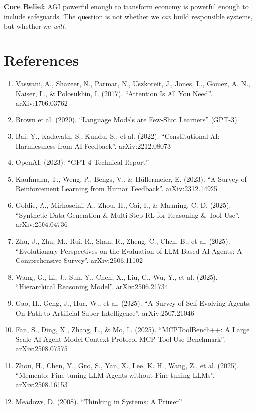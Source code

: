 \documentclass[11pt]{article}
\begin{document}
\textbf{Core Belief:} AGI powerful enough to transform economy is powerful enough to include safeguards. The question is not whether we \textit{can} build responsible systems, but whether we \textit{will}.

\section*{References}

\begin{enumerate}
    \item Vaswani, A., Shazeer, N., Parmar, N., Uszkoreit, J., Jones, L., Gomez, A. N., Kaiser, L., \& Polosukhin, I. (2017). ``Attention Is All You Need''. arXiv:1706.03762
    \item Brown et al. (2020). ``Language Models are Few-Shot Learners'' (GPT-3)
    \item Bai, Y., Kadavath, S., Kundu, S., et al. (2022). ``Constitutional AI: Harmlessness from AI Feedback''. arXiv:2212.08073
    \item OpenAI. (2023). ``GPT-4 Technical Report''
    \item Kaufmann, T., Weng, P., Bengs, V., \& Hüllermeier, E. (2023). ``A Survey of Reinforcement Learning from Human Feedback''. arXiv:2312.14925
    \item Goldie, A., Mirhoseini, A., Zhou, H., Cai, I., \& Manning, C. D. (2025). ``Synthetic Data Generation \& Multi-Step RL for Reasoning \& Tool Use''. arXiv:2504.04736
    \item Zhu, J., Zhu, M., Rui, R., Shan, R., Zheng, C., Chen, B., et al. (2025). ``Evolutionary Perspectives on the Evaluation of LLM-Based AI Agents: A Comprehensive Survey''. arXiv:2506.11102
    \item Wang, G., Li, J., Sun, Y., Chen, X., Liu, C., Wu, Y., et al. (2025). ``Hierarchical Reasoning Model''. arXiv:2506.21734
    \item Gao, H., Geng, J., Hua, W., et al. (2025). ``A Survey of Self-Evolving Agents: On Path to Artificial Super Intelligence''. arXiv:2507.21046
    \item Fan, S., Ding, X., Zhang, L., \& Mo, L. (2025). ``MCPToolBench++: A Large Scale AI Agent Model Context Protocol MCP Tool Use Benchmark''. arXiv:2508.07575
    \item Zhou, H., Chen, Y., Guo, S., Yan, X., Lee, K. H., Wang, Z., et al. (2025). ``Memento: Fine-tuning LLM Agents without Fine-tuning LLMs''. arXiv:2508.16153
    \item Meadows, D. (2008). ``Thinking in Systems: A Primer''

\end{enumerate}
\end{document}
